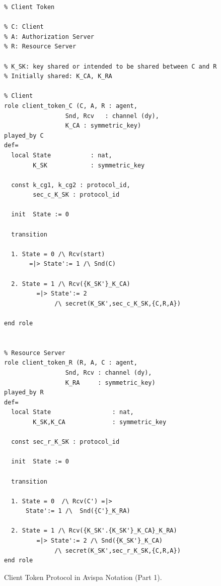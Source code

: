 \documentclass[peerreview, a4paper, 7pt]{IEEEtran}
\begin{document}
\begin{figure}[!htbp]
\begin{lstlisting}
% Client Token 

% C: Client
% A: Authorization Server
% R: Resource Server
 
% K_SK: key shared or intended to be shared between C and R
% Initially shared: K_CA, K_RA
	   
% Client
role client_token_C (C, A, R : agent,
                 Snd, Rcv   : channel (dy),
                 K_CA : symmetric_key)
played_by C
def=
  local State           : nat,
        K_SK            : symmetric_key

  const k_cg1, k_cg2 : protocol_id,
        sec_c_K_SK : protocol_id

  init  State := 0

  transition

  1. State = 0 /\ Rcv(start) 
       =|> State':= 1 /\ Snd(C)
  
  2. State = 1 /\ Rcv({K_SK'}_K_CA) 
         =|> State':= 2 
              /\ secret(K_SK',sec_c_K_SK,{C,R,A})		 
		 
end role 


% Resource Server
role client_token_R (R, A, C : agent,
                 Snd, Rcv : channel (dy),
                 K_RA     : symmetric_key)
played_by R
def=
  local State                 : nat,
        K_SK,K_CA             : symmetric_key

  const sec_r_K_SK : protocol_id

  init  State := 0

  transition

  1. State = 0  /\ Rcv(C') =|> 
      State':= 1 /\  Snd({C'}_K_RA)

  2. State = 1 /\ Rcv({K_SK'.{K_SK'}_K_CA}_K_RA) 
         =|> State':= 2 /\ Snd({K_SK'}_K_CA)	  
              /\ secret(K_SK',sec_r_K_SK,{C,R,A})
end role
\end{lstlisting}
\caption{Client Token Protocol in Avispa Notation (Part 1).}
\label{avispa-code-figure1}
\end{figure}
\end{document}
